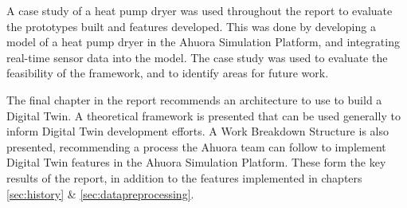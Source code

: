 A case study of a heat pump dryer was used throughout the report to evaluate the prototypes built and features developed.  This was done by developing a model of a heat pump dryer in the Ahuora Simulation Platform, and integrating real-time sensor data into the model. The case study was used to evaluate the feasibility of the framework, and to identify areas for future work.

The final chapter in the report recommends an architecture to use to build a Digital Twin. A theoretical framework is presented that can be used generally to inform Digital Twin development efforts. A Work Breakdown Structure is also presented, recommending a process the Ahuora team can follow to implement Digital Twin features in the Ahuora Simulation Platform. These form the key results of the report, in addition to the features implemented in chapters \ref{sec:history} \& \ref{sec:datapreprocessing}.
